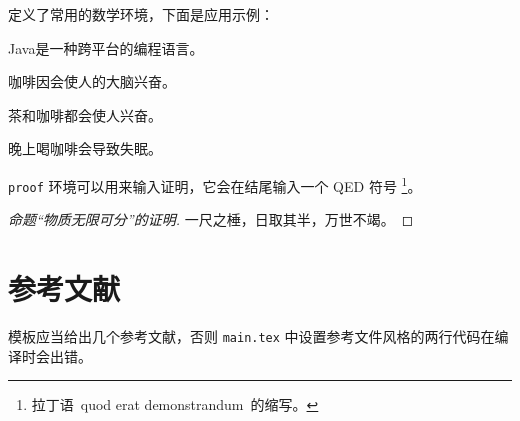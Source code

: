 \ucasthesis{} 定义了常用的数学环境，下面是应用示例：
\begin{definition}
Java是一种跨平台的编程语言。
\end{definition}

\begin{theorem}
咖啡因会使人的大脑兴奋。
\end{theorem}

\begin{lemma}
茶和咖啡都会使人兴奋。
\end{lemma}

\begin{corollary}
晚上喝咖啡会导致失眠。
\end{corollary}

\texttt{proof} 环境可以用来输入证明，它会在结尾输入一个 QED 符号
\footnote{拉丁语~quod erat demonstrandum~的缩写。}。

\begin{proof}[命题“物质无限可分”的证明]
一尺之棰，日取其半，万世不竭。
\end{proof}

\section{参考文献}
\label{sec:ref}

模板应当给出几个参考文献，否则 \texttt{main.tex} 中设置参考文件风格的两行代码在编译时会出错。\cite{chen2001,ding2001}


